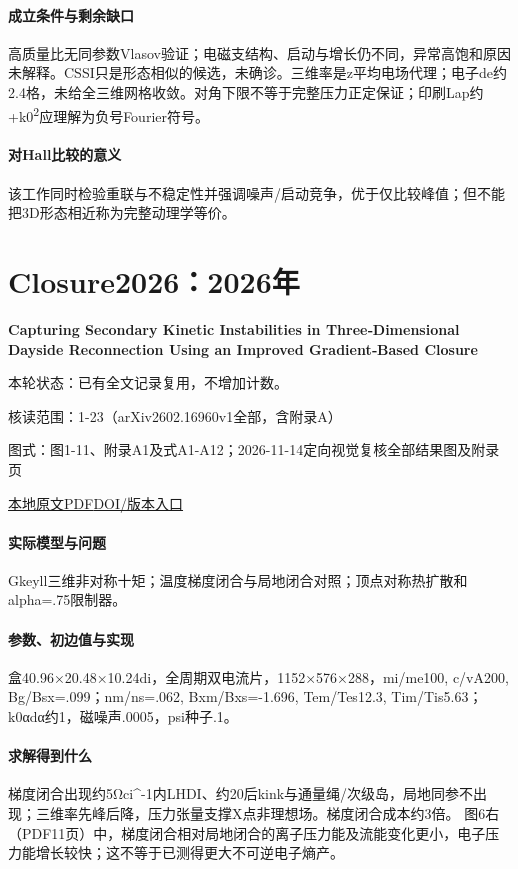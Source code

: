 \paragraph{成立条件与剩余缺口}高质量比无同参数Vlasov验证；电磁支结构、启动与增长仍不同，异常高饱和原因未解释。CSSI只是形态相似的候选，未确诊。三维率是z平均电场代理；电子de约2.4格，未给全三维网格收敛。对角下限不等于完整压力正定保证；印刷Lap约+k0\textsuperscript{2}应理解为负号Fourier符号。

\paragraph{对Hall比较的意义}该工作同时检验重联与不稳定性并强调噪声/启动竞争，优于仅比较峰值；但不能把3D形态相近称为完整动理学等价。

\section{Closure2026：2026年}\label{paper:Closure2026}

\textbf{Capturing Secondary Kinetic Instabilities in Three‐Dimensional Dayside Reconnection Using an Improved Gradient‐Based Closure}\citep{Closure2026}

\textsf{本轮状态：}已有全文记录复用，不增加计数。

\textsf{核读范围：}1-23（arXiv2602.16960v1全部，含附录A）\par\textsf{图式：}图1-11、附录A1及式A1-A12；2026-11-14定向视觉复核全部结果图及附录页

\href{run:../../papers/Closure2026.pdf}{本地原文PDF}\quad\href{https://doi.org/10.1029/2026ja035250}{DOI/版本入口}

\paragraph{实际模型与问题}Gkeyll三维非对称十矩；温度梯度闭合与局地闭合对照；顶点对称热扩散和alpha=.75限制器。

\paragraph{参数、初边值与实现}盒40.96×20.48×10.24di，全周期双电流片，1152×576×288，mi/me100, c/vA200, Bg/Bsx=.099；nm/ns=.062, Bxm/Bxs=-1.696, Tem/Tes12.3, Tim/Tis5.63；k0αdα约1，磁噪声.0005，psi种子.1。

\paragraph{求解得到什么}梯度闭合出现约5Ωci\textasciicircum{}-1内LHDI、约20后kink与通量绳/次级岛，局地同参不出现；三维率先峰后降，压力张量支撑X点非理想场。梯度闭合成本约3倍。 图6右（PDF11页）中，梯度闭合相对局地闭合的离子压力能及流能变化更小，电子压力能增长较快；这不等于已测得更大不可逆电子熵产。


